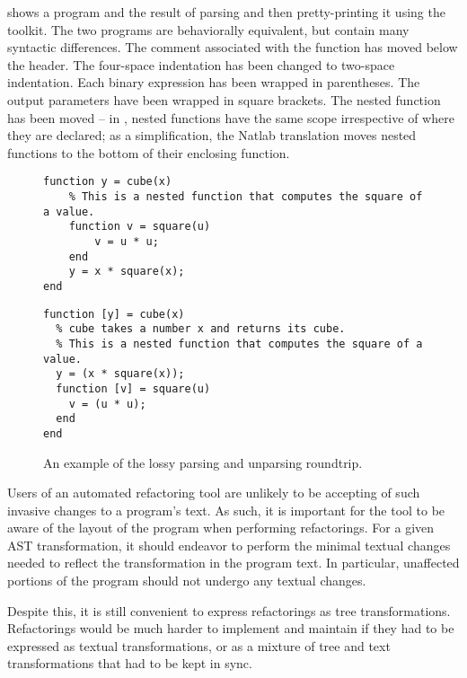  shows a \matlab program and the result of parsing and
then pretty-printing it using the \mclab toolkit. The two programs are
behaviorally equivalent, but contain many syntactic differences. The comment
associated with the  function has moved below the header. The
four-space indentation has been changed to two-space indentation. Each binary
expression has been wrapped in parentheses.  The output parameters have been
wrapped in square brackets.  The nested function  has been moved
-- in \matlab, nested functions have the same scope irrespective of where they
are declared; as a simplification, the Natlab translation moves nested
functions to the bottom of their enclosing function.

\begin{figure}
\begin{minipage}{0.5\linewidth}
\begin{lstlisting}[numbers=none]
% cube takes a number x and returns its cube.
function y = cube(x)
    % This is a nested function that computes the square of a value.
    function v = square(u)
        v = u * u;
    end
    y = x * square(x);
end
\end{lstlisting}
\end{minipage}
\hfill \hspace{.3cm} \hfill
\begin{minipage}{0.5\linewidth}
\begin{lstlisting}[numbers=none]
function [y] = cube(x)
  % cube takes a number x and returns its cube.
  % This is a nested function that computes the square of a value.
  y = (x * square(x));
  function [v] = square(u)
    v = (u * u);
  end
end
\end{lstlisting}
\end{minipage}
\caption{An example of the lossy parsing and unparsing roundtrip.}
\label{Fig:LostLayout}
\end{figure}

Users of an automated refactoring tool are unlikely to be accepting of such
invasive changes to a program's text. As such, it is important for the tool to
be aware of the layout of the program when performing refactorings. For a given
AST transformation, it should endeavor to perform the minimal textual changes
needed to reflect the transformation in the program text. In particular,
unaffected portions of the program should not undergo any textual changes.

Despite this, it is still convenient to express refactorings as tree
transformations. Refactorings would be much harder to implement and maintain if
they had to be expressed as textual transformations, or as a mixture of tree
and text transformations that had to be kept in sync.

